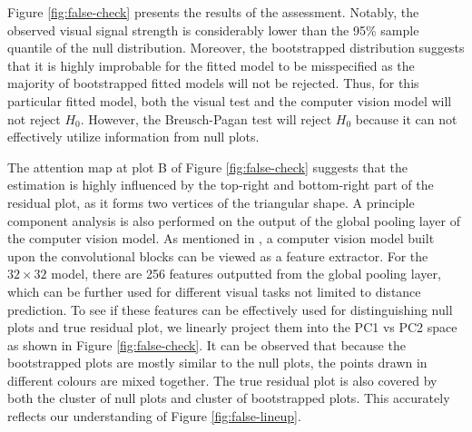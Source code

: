 \documentclass[]{interact}
\theoremstyle{plain}%
\theoremstyle{definition}
\theoremstyle{remark}
\newenvironment{Shaded}{\begin{snugshade}}{\end{snugshade}}
\newcommand{\AttributeTok}[1]{\textcolor[rgb]{0.13,0.29,0.53}{#1}}
\newcommand{\DataTypeTok}[1]{\textcolor[rgb]{0.13,0.29,0.53}{#1}}
\newcommand{\DecValTok}[1]{\textcolor[rgb]{0.00,0.00,0.81}{#1}}
\newcommand{\FunctionTok}[1]{\textcolor[rgb]{0.13,0.29,0.53}{\textbf{#1}}}
\newcommand{\NormalTok}[1]{#1}
\newcommand{\SpecialCharTok}[1]{\textcolor[rgb]{0.81,0.36,0.00}{\textbf{#1}}}
\begin{document}
\begin{Shaded}
\end{Shaded}

Figure \ref{fig:false-check} presents the results of the assessment.
Notably, the observed visual signal strength is considerably lower than
the 95\% sample quantile of the null distribution. Moreover, the
bootstrapped distribution suggests that it is highly improbable for the
fitted model to be misspecified as the majority of bootstrapped fitted
models will not be rejected. Thus, for this particular fitted model,
both the visual test and the computer vision model will not reject
\(H_0\). However, the Breusch-Pagan test will reject \(H_0\) because it
can not effectively utilize information from null plots.

The attention map at plot B of Figure \ref{fig:false-check} suggests
that the estimation is highly influenced by the top-right and
bottom-right part of the residual plot, as it forms two vertices of the
triangular shape. A principle component analysis is also performed on
the output of the global pooling layer of the computer vision model. As
mentioned in \citet{simonyan2014very}, a computer vision model built
upon the convolutional blocks can be viewed as a feature extractor. For
the \(32 \times 32\) model, there are 256 features outputted from the
global pooling layer, which can be further used for different visual
tasks not limited to distance prediction. To see if these features can
be effectively used for distinguishing null plots and true residual
plot, we linearly project them into the PC1 vs PC2 space as shown in
Figure \ref{fig:false-check}. It can be observed that because the
bootstrapped plots are mostly similar to the null plots, the points
drawn in different colours are mixed together. The true residual plot is
also covered by both the cluster of null plots and cluster of
bootstrapped plots. This accurately reflects our understanding of Figure
\ref{fig:false-lineup}.
\end{document}

